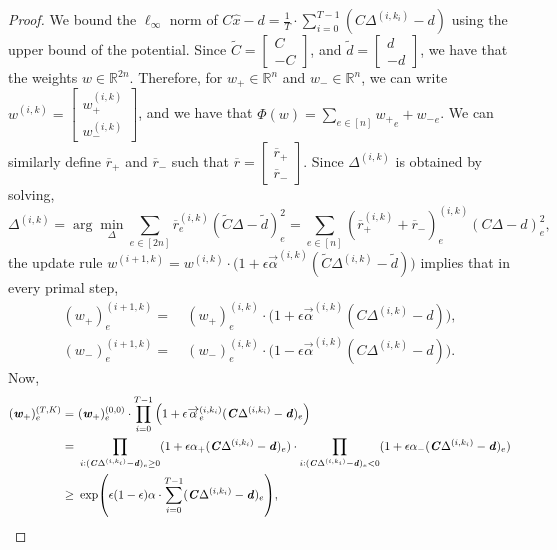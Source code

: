 \documentclass[11pt]{article}
\let\originalleft\left
\let\originalright\right
\renewcommand{\left}{\mathopen{}\mathclose\bgroup\originalleft}
\renewcommand{\right}{\aftergroup\egroup\originalright}
\newcommand\dd{\boldsymbol{\mathit{d}}}
\newcommand\rr{\boldsymbol{\mathit{r}}}
\newcommand\ww{\boldsymbol{\mathit{w}}}
\newcommand\xx{\boldsymbol{\mathit{x}}}
\newcommand\CC{\boldsymbol{\mathit{C}}}
\newcommand\xxhat{\widehat{\xx}}
\newcommand{\wt}{\widetilde}
\newcommand{\ov}{\overline}
\begin{document}
\begin{proof}
We bound the $\ell_{\infty}$ norm of $\CC \xxhat - \dd = \frac{1}{T} \cdot \sum_{i=0}^{T-1} (\CC \Delta^{(i,k_i)} - \dd)$ using the upper bound of the potential. Since $\wt{\CC} = \begin{bmatrix}
    \CC \\-\CC
\end{bmatrix}$, and $\wt{\dd}= \begin{bmatrix}
    \dd \\-\dd
\end{bmatrix}$, we have that the weights $\ww \in \mathbb{R}^{2n}$. Therefore, for $\ww_+\in \mathbb{R}^n$ and $\ww_{-}\in \mathbb{R}^n$, we can write $\ww^{(i,k)} = \begin{bmatrix}
    \ww_+^{(i,k)}\\ \ww_{-}^{(i,k)}
\end{bmatrix}$, and we have that $\Phi(\ww) = \sum_{e\in [n]}{\ww_+}_e + {\ww_{-}}_e$. We can similarly define $\ov{\rr}_+$ and $\ov{\rr}_{-}$ such that $\ov{\rr} = \begin{bmatrix}
    \ov{\rr}_+\\ \ov{\rr}_{-}
\end{bmatrix}$. Since $\Delta^{(i,k)}$ is obtained by solving,
\[
\Delta^{(i,k)} = \arg\min_{\Delta}\sum_{e\in [2n]}\ov{\rr}^{(i,k)}_e (\wt{\CC}\Delta-\wt{\dd})_e^2 = \sum_{e\in [n]}(\ov{\rr}_+^{(i,k)} + \ov{\rr}_{-})^{(i,k)}_e (\CC\Delta-\dd)_e^2, 
\]
the update rule $\ww^{(i+1,k)} = \ww^{(i,k)} \cdot \big(1 + \epsilon \overrightarrow{\alpha}^{(i,k)} (\wt{\CC} \Delta^{(i,k)} - \wt{\dd})\big)$ implies that in every primal step,
\begin{align*}
(\ww_+)_e^{(i+1,k)}=&~ (\ww_+)_e^{(i,k)} \cdot \big(1 + \epsilon \overrightarrow{\alpha}^{(i,k)} (\CC \Delta^{(i,k)} - \dd)\big), \\
(\ww_-)_e^{(i+1,k)}=&~ (\ww_-)_e^{(i,k)} \cdot \big(1 - \epsilon\overrightarrow{\alpha}^{(i,k)} (\CC \Delta^{(i,k)} - \dd)\big).
\end{align*}
Now,
\begin{align*}
(\ww_+)^{(T,K)}_e = &~ (\ww_+)^{(0,0)}_e \cdot \prod_{i=0}^{T-1} \Big(1 + \epsilon \overrightarrow{\alpha}^{(i,k_i)}_e (\CC \Delta^{(i,k_i)} - \dd)_e\Big) \\
= &~ \prod_{i: (\CC \Delta^{(i,k_i)} - \dd)_e \geq 0} (1 + \epsilon \alpha_+ (\CC \Delta^{(i,k_i)} - \dd)_e) \cdot \prod_{i: (\CC \Delta^{(i,k_i)} - \dd)_e < 0} (1 + \epsilon \alpha_- (\CC \Delta^{(i,k_i)} - \dd)_e) \\
\geq &~ \exp\left(\epsilon(1-\epsilon)\alpha \cdot \sum_{i=0}^{T-1} (\CC \Delta^{(i,k_i)} - \dd)_e\right),

\end{align*}
\end{proof}
\end{document}
